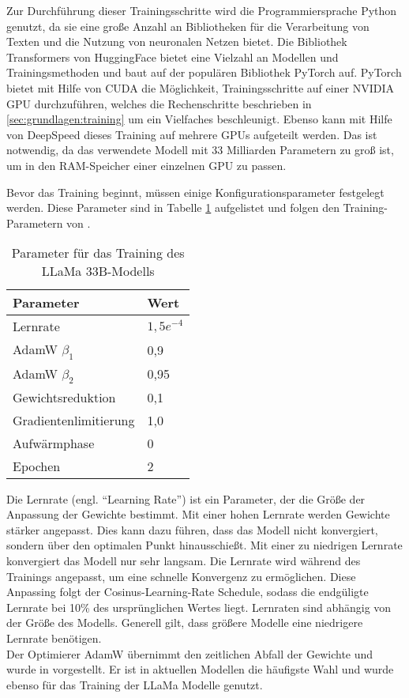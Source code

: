 Zur Durchführung dieser Trainingsschritte wird die Programmiersprache Python genutzt, da sie eine große Anzahl an Bibliotheken für die Verarbeitung von Texten und die Nutzung von neuronalen Netzen bietet.
Die Bibliothek Transformers von HuggingFace bietet eine Vielzahl an Modellen und Trainingsmethoden und baut auf der populären Bibliothek PyTorch auf.
PyTorch bietet mit Hilfe von CUDA die Möglichkeit, Trainingsschritte auf einer NVIDIA GPU durchzuführen, welches die Rechenschritte beschrieben in \ref{sec:grundlagen:training} um ein Vielfaches beschleunigt.
Ebenso kann mit Hilfe von DeepSpeed dieses Training auf mehrere GPUs aufgeteilt werden.
Das ist notwendig, da das verwendete Modell mit 33 Milliarden Parametern zu groß ist, um in den RAM-Speicher einer einzelnen GPU zu passen.

Bevor das Training beginnt, müssen einige Konfigurationsparameter festgelegt werden.
Diese Parameter sind in Tabelle \ref{tab:training:parameter} aufgelistet und folgen den Training-Parametern von \citet{llama}.\\

\begin{table}
    \centering
    \begin{tabular}{ll}
        \hline
        \textbf{Parameter} & \textbf{Wert} \\
        \hline
        Lernrate & $1,5e^{-4}$\\
        AdamW $\beta_1$ & 0,9\\
        AdamW $\beta_2$ & 0,95\\
        Gewichtsreduktion & 0,1\\
        Gradientenlimitierung & 1,0\\
        Aufwärmphase & 0\\
        Epochen & 2\\
        \hline
    \end{tabular}
    \caption{Parameter für das Training des LLaMa 33B-Modells}
    \label{tab:training:parameter}
\end{table}

Die Lernrate (engl. \enquote{Learning Rate}) ist ein Parameter, der die Größe der Anpassung der Gewichte bestimmt.
Mit einer hohen Lernrate werden Gewichte stärker angepasst.
Dies kann dazu führen, dass das Modell nicht konvergiert, sondern über den optimalen Punkt hinausschießt.
Mit einer zu niedrigen Lernrate konvergiert das Modell nur sehr langsam.
Die Lernrate wird während des Trainings angepasst, um eine schnelle Konvergenz zu ermöglichen.
Diese Anpassing folgt der Cosinus-Learning-Rate Schedule, sodass die endgüligte Lernrate bei 10\% des ursprünglichen Wertes liegt.
Lernraten sind abhängig von der Größe des Modells.
Generell gilt, dass größere Modelle eine niedrigere Lernrate benötigen.\\
Der Optimierer AdamW übernimmt den zeitlichen Abfall der Gewichte und wurde  in \citet{adamw} vorgestellt.
Er ist in aktuellen Modellen die häufigste Wahl und wurde ebenso für das Training der LLaMa Modelle genutzt.\\


